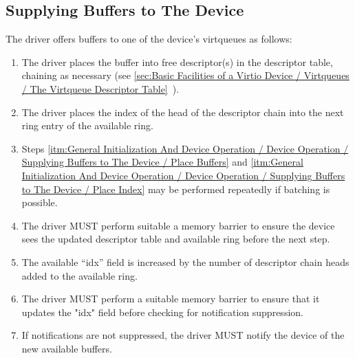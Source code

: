 \subsection{Supplying Buffers to The Device}\label{sec:General Initialization And Device Operation / Device Operation / Supplying Buffers to The Device}

The driver offers buffers to one of the device's virtqueues as follows:

\begin{enumerate}
\item\label{itm:General Initialization And Device Operation / Device Operation / Supplying Buffers to The Device / Place Buffers} The driver places the buffer into free descriptor(s) in the
   descriptor table, chaining as necessary (see \ref{sec:Basic Facilities of a Virtio Device / Virtqueues / The Virtqueue Descriptor Table}~).

\item\label{itm:General Initialization And Device Operation / Device Operation / Supplying Buffers to The Device / Place Index} The driver places the index of the head of the descriptor chain
   into the next ring entry of the available ring.

\item Steps \ref{itm:General Initialization And Device Operation / Device Operation / Supplying Buffers to The Device / Place Buffers} and \ref{itm:General Initialization And Device Operation / Device Operation / Supplying Buffers to The Device / Place Index} may be performed repeatedly if batching
  is possible.

\item The driver MUST perform suitable a memory barrier to ensure the device sees
  the updated descriptor table and available ring before the next
  step.

\item The available “idx” field is increased by the number of
  descriptor chain heads added to the available ring.

\item The driver MUST perform a suitable memory barrier to ensure that it updates
  the "idx" field before checking for notification suppression.

\item If notifications are not suppressed, the driver MUST notify the device
    of the new available buffers.
\end{enumerate}

